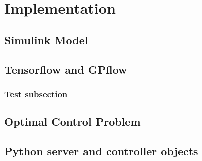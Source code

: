 \section{Implementation}

\subsection{Simulink Model}

\subsection{Tensorflow and GPflow}
\subsubsection{Test subsection}

\subsection{Optimal Control Problem}

\subsection{Python server and controller objects}


\clearpage
